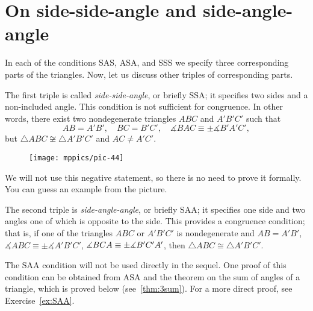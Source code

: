 




\section{On side-side-angle and side-angle-angle}

In each of the conditions SAS, ASA, and SSS we specify three corresponding parts of the triangles.
Now, let us discuss other triples of corresponding parts.

The first triple is called {}\emph{side-side-angle}, or briefly SSA;
it specifies two sides and a non-included angle.
This condition is not sufficient for congruence.
In other words, there exist two nondegenerate triangles $ABC$ and $A'B'C'$ such that
\[AB=A'B',\quad BC=B'C',\quad \measuredangle BAC\equiv\pm \measuredangle B'A'C',\]
but $\triangle ABC\not\cong\triangle A'B'C'$ and $AC\ne A'C'$.

\begin{wrapfigure}{r}{35mm}
\vskip-6mm
\centering
\texttt{[image: mppics/pic-44]}
\end{wrapfigure}

We will not use this negative statement, so there is no need to prove it formally.
You can guess an example from the picture.

The second triple is {}\emph{side-angle-angle}, or briefly SAA;
it specifies one side and two angles one of which is opposite to the side.
This provides a congruence condition; 
that is, if one of the triangles $ABC$ or $A'B'C'$ is nondegenerate and
$AB=A'B'$, $\measuredangle ABC\equiv\pm \measuredangle A'B'C'$, $\measuredangle BCA\equiv\pm \measuredangle B'C'A'$,
then $\triangle ABC\cong\triangle A'B'C'$.

The SAA condition will not be used directly in the sequel.
One proof of this condition can be obtained from ASA and the theorem on the sum of angles of a triangle, which is proved below (see~\ref{thm:3sum}). 
For a more direct proof, see Exercise~\ref{ex:SAA}.


